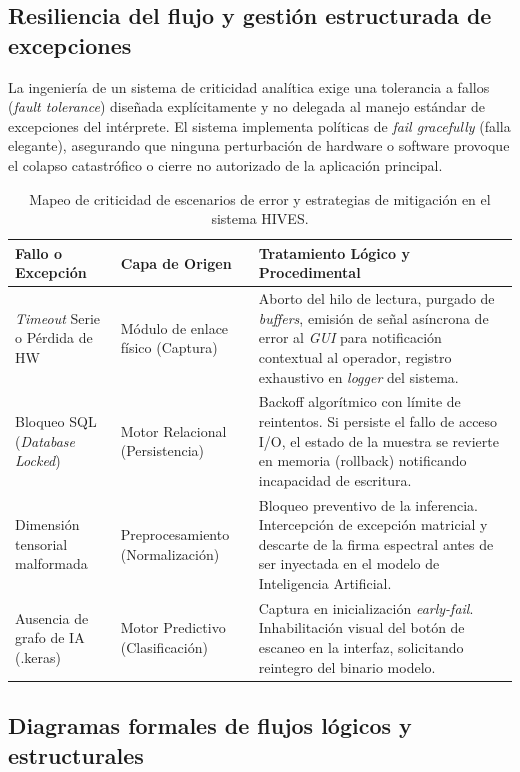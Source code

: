 \subsection*{Resiliencia del flujo y gestión estructurada de excepciones}

La ingeniería de un sistema de criticidad analítica exige una tolerancia a fallos (\textit{fault tolerance}) diseñada explícitamente y no delegada al manejo estándar de excepciones del intérprete. El sistema implementa políticas de \textit{fail gracefully} (falla elegante), asegurando que ninguna perturbación de hardware o software provoque el colapso catastrófico o cierre no autorizado de la aplicación principal. 

\begin{table}[H]
  \centering
  \caption{Mapeo de criticidad de escenarios de error y estrategias de mitigación en el sistema HIVES.}
  \label{tab:excepciones}
  \begin{tabular}{p{3.5cm} p{3.5cm} p{7cm}}
    \toprule
    \textbf{Fallo o Excepción} & \textbf{Capa de Origen} & \textbf{Tratamiento Lógico y Procedimental} \\
    \midrule
    \textit{Timeout} Serie o Pérdida de HW & Módulo de enlace físico (Captura) & Aborto del hilo de lectura, purgado de \textit{buffers}, emisión de señal asíncrona de error al \textit{GUI} para notificación contextual al operador, registro exhaustivo en \textit{logger} del sistema. \\
    Bloqueo SQL (\textit{Database Locked}) & Motor Relacional (Persistencia) & Backoff algorítmico con límite de reintentos. Si persiste el fallo de acceso I/O, el estado de la muestra se revierte en memoria (rollback) notificando incapacidad de escritura. \\
    Dimensión tensorial malformada & Preprocesamiento (Normalización) & Bloqueo preventivo de la inferencia. Intercepción de excepción matricial y descarte de la firma espectral antes de ser inyectada en el modelo de Inteligencia Artificial. \\
    Ausencia de grafo de IA (.keras) & Motor Predictivo (Clasificación) & Captura en inicialización \textit{early-fail}. Inhabilitación visual del botón de escaneo en la interfaz, solicitando reintegro del binario modelo. \\
    \bottomrule
  \end{tabular}
\end{table}

\clearpage
\subsection*{Diagramas formales de flujos lógicos y estructurales}

